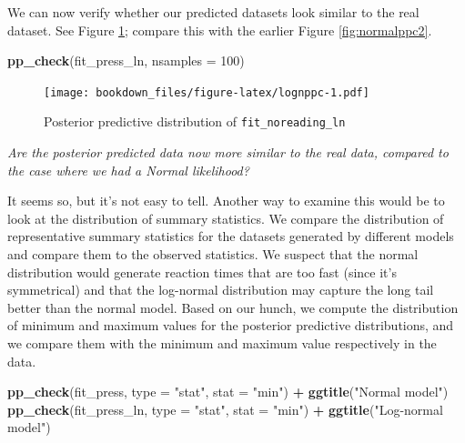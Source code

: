 \documentclass[12pt,]{krantz}
\newenvironment{Shaded}{\begin{snugshade}}{\end{snugshade}}
\newcommand{\KeywordTok}[1]{\textcolor[rgb]{0.13,0.29,0.53}{\textbf{#1}}}
\newcommand{\DataTypeTok}[1]{\textcolor[rgb]{0.13,0.29,0.53}{#1}}
\newcommand{\DecValTok}[1]{\textcolor[rgb]{0.00,0.00,0.81}{#1}}
\newcommand{\StringTok}[1]{\textcolor[rgb]{0.31,0.60,0.02}{#1}}
\newcommand{\OperatorTok}[1]{\textcolor[rgb]{0.81,0.36,0.00}{\textbf{#1}}}
\newcommand{\NormalTok}[1]{#1}
\theoremstyle{definition}
\theoremstyle{definition}
\theoremstyle{definition}
\theoremstyle{remark}
\begin{document}
We can now verify whether our predicted datasets look similar to the
real dataset. See Figure \ref{fig:lognppc}; compare this with the
earlier Figure \ref{fig:normalppc2}.




\begin{Shaded}
\begin{Highlighting}[]
\KeywordTok{pp_check}\NormalTok{(fit_press_ln, }\DataTypeTok{nsamples =} \DecValTok{100}\NormalTok{)}
\end{Highlighting}
\end{Shaded}

\begin{figure}
\centering
\texttt{[image: bookdown\_files/figure-latex/lognppc-1.pdf]}
\caption{\label{fig:lognppc}Posterior predictive distribution of
\texttt{fit\_noreading\_ln}}
\end{figure}

\emph{Are the posterior predicted data now more similar to the real
data, compared to the case where we had a Normal likelihood?}

It seems so, but it's not easy to tell. Another way to examine this
would be to look at the distribution of summary statistics. We compare
the distribution of representative summary statistics for the datasets
generated by different models and compare them to the observed
statistics. We suspect that the normal distribution would generate
reaction times that are too fast (since it's symmetrical) and that the
log-normal distribution may capture the long tail better than the normal
model. Based on our hunch, we compute the distribution of minimum and
maximum values for the posterior predictive distributions, and we
compare them with the minimum and maximum value respectively in the
data.

\begin{Shaded}
\begin{Highlighting}[]
\KeywordTok{pp_check}\NormalTok{(fit_press, }\DataTypeTok{type =} \StringTok{"stat"}\NormalTok{, }\DataTypeTok{stat =} \StringTok{"min"}\NormalTok{) }\OperatorTok{+}\StringTok{ }\KeywordTok{ggtitle}\NormalTok{(}\StringTok{"Normal model"}\NormalTok{)}
\KeywordTok{pp_check}\NormalTok{(fit_press_ln, }\DataTypeTok{type =} \StringTok{"stat"}\NormalTok{, }\DataTypeTok{stat =} \StringTok{"min"}\NormalTok{) }\OperatorTok{+}\StringTok{ }\KeywordTok{ggtitle}\NormalTok{(}\StringTok{"Log-normal model"}\NormalTok{)}
\end{Highlighting}
\end{Shaded}
\end{document}
